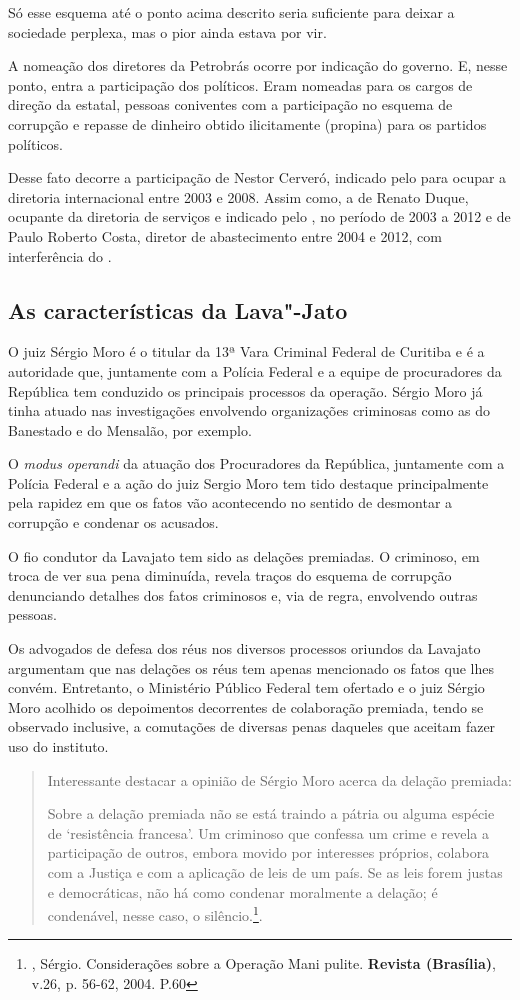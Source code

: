 Só esse esquema até o ponto acima descrito seria suficiente para deixar
a sociedade perplexa, mas o pior ainda estava por vir.

A nomeação dos diretores da Petrobrás ocorre por indicação do governo.
E, nesse ponto, entra a participação dos políticos. Eram nomeadas para
os cargos de direção da estatal, pessoas coniventes com a participação
no esquema de corrupção e repasse de dinheiro obtido ilicitamente
(propina) para os partidos políticos.

Desse fato decorre a participação de Nestor Cerveró, indicado pelo 
para ocupar a diretoria internacional entre 2003 e 2008. Assim como, a
de Renato Duque, ocupante da diretoria de serviços e indicado pelo ,
no período de 2003 a 2012 e de Paulo Roberto Costa, diretor de
abastecimento entre 2004 e 2012, com interferência do .

\subsection{As características da Lava"-Jato}

O juiz Sérgio Moro é o titular da 13ª Vara Criminal Federal de Curitiba
e é a autoridade que, juntamente com a Polícia Federal e a equipe de
procuradores da República tem conduzido os principais processos da
operação. Sérgio Moro já tinha atuado nas investigações envolvendo
organizações criminosas como as do Banestado e do Mensalão, por exemplo.

O \emph{modus operandi} da atuação dos Procuradores da República,
juntamente com a Polícia Federal e a ação do juiz Sergio Moro tem tido
destaque principalmente pela rapidez em que os fatos vão acontecendo no
sentido de desmontar a corrupção e condenar os acusados.

O fio condutor da Lavajato tem sido as delações premiadas. O criminoso,
em troca de ver sua pena diminuída, revela traços do esquema de
corrupção denunciando detalhes dos fatos criminosos e, via de regra,
envolvendo outras pessoas.

Os advogados de defesa dos réus nos diversos processos oriundos da
Lavajato argumentam que nas delações os réus tem apenas mencionado os
fatos que lhes convém. Entretanto, o Ministério Público Federal tem
ofertado e o juiz Sérgio Moro acolhido os depoimentos decorrentes de
colaboração premiada, tendo se observado inclusive, a comutações de
diversas penas daqueles que aceitam fazer uso do instituto.

\begin{quote}
Interessante destacar a opinião de Sérgio Moro acerca da delação
premiada:

Sobre a delação premiada não se está traindo a pátria ou alguma espécie
de `resistência francesa'. Um criminoso que confessa um crime e revela a
participação de outros, embora movido por interesses próprios, colabora
com a Justiça e com a aplicação de leis de um país. Se as leis forem
justas e democráticas, não há como condenar moralmente a delação; é
condenável, nesse caso, o silêncio.\footnote{, Sérgio. Considerações
  sobre a Operação Mani pulite. \textbf{Revista  (Brasília)}, v.26,
  p. 56-62, 2004. P.60}.
\end{quote}

